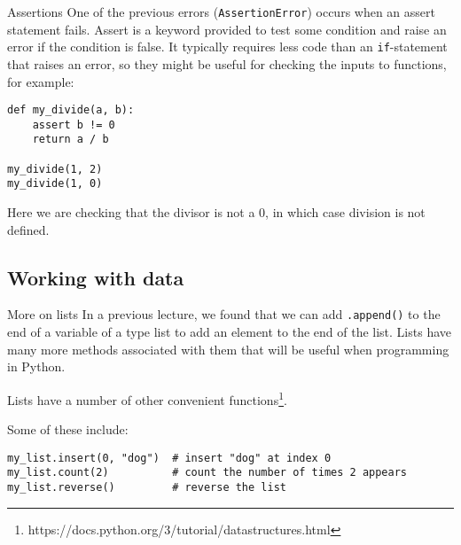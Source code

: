 \documentclass[10pt]{beamer}
\newcommand{\footnoteframe}[1]{\footnote[frame]{#1}}
\begin{document}
\begin{frame}[label={sec:orgef905ea},fragile]{Assertions}
 One of the previous errors (\texttt{AssertionError}) occurs when an assert statement
fails. Assert is a keyword provided to test some condition and raise an error if the
condition is false. It typically requires less code than an \texttt{if}-statement that raises
an error, so they might be useful for checking the inputs to functions, for example:

\begin{verbatim}
def my_divide(a, b):
    assert b != 0
    return a / b

my_divide(1, 2)
my_divide(1, 0)
\end{verbatim}

Here we are checking that the divisor is not a 0, in which case division is not defined.
\end{frame}

\subsection{Working with data}
\label{sec:org9ce25e0}

\begin{frame}[label={sec:orgd44e72a},fragile]{More on lists}
 In a previous lecture, we found that we can add \texttt{.append()} to the end of a variable of
a type list to add an element to the end of the list. Lists have many more methods
associated with them that will be useful when programming in Python.

Lists have a number of other convenient functions\footnoteframe{https://docs.python.org/3/tutorial/datastructures.html}.

Some of these include:

\begin{verbatim}
my_list.insert(0, "dog")  # insert "dog" at index 0
my_list.count(2)          # count the number of times 2 appears
my_list.reverse()         # reverse the list
\end{verbatim}
\end{frame}
\end{document}
